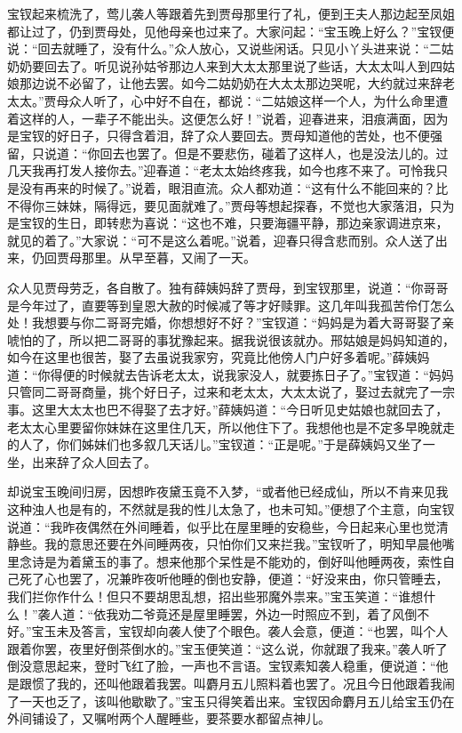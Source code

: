 \begin{parag}
    宝钗起来梳洗了，莺儿袭人等跟着先到贾母那里行了礼，便到王夫人那边起至凤姐都让过了，仍到贾母处，见他母亲也过来了。大家问起：“宝玉晚上好么？”宝钗便说：“回去就睡了，没有什么。”众人放心，又说些闲话。只见小丫头进来说：“二姑奶奶要回去了。听见说孙姑爷那边人来到大太太那里说了些话，大太太叫人到四姑娘那边说不必留了，让他去罢。如今二姑奶奶在大太太那边哭呢，大约就过来辞老太太。”贾母众人听了，心中好不自在，都说：“二姑娘这样一个人，为什么命里遭着这样的人，一辈子不能出头。这便怎么好！”说着，迎春进来，泪痕满面，因为是宝钗的好日子，只得含着泪，辞了众人要回去。贾母知道他的苦处，也不便强留，只说道：“你回去也罢了。但是不要悲伤，碰着了这样人，也是没法儿的。过几天我再打发人接你去。”迎春道：“老太太始终疼我，如今也疼不来了。可怜我只是没有再来的时候了。”说着，眼泪直流。众人都劝道：“这有什么不能回来的？比不得你三妹妹，隔得远，要见面就难了。”贾母等想起探春，不觉也大家落泪，只为是宝钗的生日，即转悲为喜说：“这也不难，只要海疆平静，那边亲家调进京来，就见的着了。”大家说：“可不是这么着呢。”说着，迎春只得含悲而别。众人送了出来，仍回贾母那里。从早至暮，又闹了一天。
\end{parag}


\begin{parag}
    众人见贾母劳乏，各自散了。独有薛姨妈辞了贾母，到宝钗那里，说道：“你哥哥是今年过了，直要等到皇恩大赦的时候减了等才好赎罪。这几年叫我孤苦伶仃怎么处！我想要与你二哥哥完婚，你想想好不好？”宝钗道：“妈妈是为着大哥哥娶了亲唬怕的了，所以把二哥哥的事犹豫起来。据我说很该就办。邢姑娘是妈妈知道的，如今在这里也很苦，娶了去虽说我家穷，究竟比他傍人门户好多着呢。”薛姨妈道：“你得便的时候就去告诉老太太，说我家没人，就要拣日子了。”宝钗道：“妈妈只管同二哥哥商量，挑个好日子，过来和老太太，大太太说了，娶过去就完了一宗事。这里大太太也巴不得娶了去才好。”薛姨妈道：“今日听见史姑娘也就回去了，老太太心里要留你妹妹在这里住几天，所以他住下了。我想他也是不定多早晚就走的人了，你们姊妹们也多叙几天话儿。”宝钗道：“正是呢。”于是薛姨妈又坐了一坐，出来辞了众人回去了。
\end{parag}


\begin{parag}
    却说宝玉晚间归房，因想昨夜黛玉竟不入梦，“或者他已经成仙，所以不肯来见我这种浊人也是有的，不然就是我的性儿太急了，也未可知。”便想了个主意，向宝钗说道：“我昨夜偶然在外间睡着，似乎比在屋里睡的安稳些，今日起来心里也觉清静些。我的意思还要在外间睡两夜，只怕你们又来拦我。”宝钗听了，明知早晨他嘴里念诗是为着黛玉的事了。想来他那个呆性是不能劝的，倒好叫他睡两夜，索性自己死了心也罢了，况兼昨夜听他睡的倒也安静，便道：“好没来由，你只管睡去，我们拦你作什么！但只不要胡思乱想，招出些邪魔外祟来。”宝玉笑道：“谁想什么！”袭人道：“依我劝二爷竟还是屋里睡罢，外边一时照应不到，着了风倒不好。”宝玉未及答言，宝钗却向袭人使了个眼色。袭人会意，便道：“也罢，叫个人跟着你罢，夜里好倒茶倒水的。”宝玉便笑道：“这么说，你就跟了我来。”袭人听了倒没意思起来，登时飞红了脸，一声也不言语。宝钗素知袭人稳重，便说道：“他是跟惯了我的，还叫他跟着我罢。叫麝月五儿照料着也罢了。况且今日他跟着我闹了一天也乏了，该叫他歇歇了。”宝玉只得笑着出来。宝钗因命麝月五儿给宝玉仍在外间铺设了，又嘱咐两个人醒睡些，要茶要水都留点神儿。
\end{parag}


